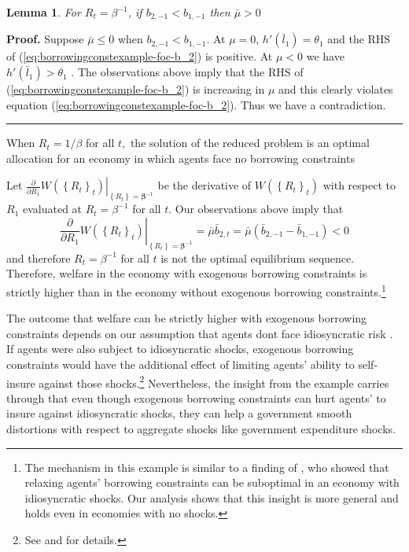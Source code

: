 \documentclass[thmsb,11pt]{article}
\newtheorem{lemma}{Lemma}
\newenvironment{proof}[1][Proof]{\noindent \textbf{#1.} }{\  \rule{0.5em}{0.5em}}
\begin{document}
\begin{lemma}
 For $R_t=\beta^{-1}$, if $b_{2,-1}<b_{1,-1}$ then $\bar{\mu}>0$
\end{lemma}
\begin{proof}
 Suppose $\bar{\mu}\leq0$ when $b_{2,-1}<b_{1,-1}$.  At $\mu=0$, $h'(\bar{l}_1)=\theta_1$  and the RHS of (\ref{eq:borrowingconstexample-foc-b_2}) is positive.  At $\mu<0$ we have $h'(\bar{l}_1)>\theta_1$ . The observations above imply that the RHS of (\ref{eq:borrowingconstexample-foc-b_2}) is increasing in $\mu$ and this clearly violates equation (\ref{eq:borrowingconstexample-foc-b_2}).  Thus we have a contradiction.
 \end{proof}
\smallskip

When $R_{t}=1/\beta $ for all $t,$
the solution of the reduced problem is an optimal allocation for an economy
in which agents face no borrowing constraints

Let $\left. \frac{\partial }{\partial R_{1}}W\left( \left \{ R_{t}\right \}
_{t}\right) \right \vert _{\left \{ R_{t}\right \} =\mathbf{\beta }^{-1}}$
be the derivative of $W\left( \left \{ R_{t}\right \} _{t}\right) $ with
respect to $R_{1}$ evaluated at $R_{t}=\beta ^{-1}$ for all $t$. Our
observations above imply that
\begin{equation*}
\left. \frac{\partial }{\partial R_{1}}W\left( \left \{ R_{t}\right \}
_{t}\right) \right \vert _{\left \{ R_{t}\right \} =\mathbf{\beta }^{-1}}=%
\bar{\mu}\bar{b}_{2,t}=\bar{\mu}\left( \bar{b}_{2,-1}-\bar{b}%
_{1,-1}\right) <0
\end{equation*}
and therefore $R_{t}=\beta ^{-1}$ for all $t$ is not the optimal equilibrium
sequence. Therefore, welfare in the economy with exogenous borrowing
constraints is strictly higher than in the economy without exogenous
borrowing constraints.\footnote{%
The mechanism in this example is similar to a finding of \cite{Yared2010}, who
showed that relaxing agents' borrowing constraints can be suboptimal in an
economy with idiosyncratic shocks. Our analysis shows that this insight is
more general and holds even in economies with no shocks.}

The outcome that welfare can be strictly higher with exogenous borrowing
constraints depends on our assumption that agents dont face idiosyncratic risk . If agents were also subject to idiosyncratic shocks,
exogenous borrowing constraints would have the additional effect of limiting
agents' ability to self-insure against those shocks.\footnote{%
See \cite{Aiyagari1998} and \cite{Heathcote2005} for details.}
Nevertheless, the insight from the example carries through that even though exogenous
borrowing constraints can hurt agents' to insure against idiosyncratic shocks, they
can help a government smooth distortions with respect to aggregate shocks
like government expenditure shocks.
\end{document}
